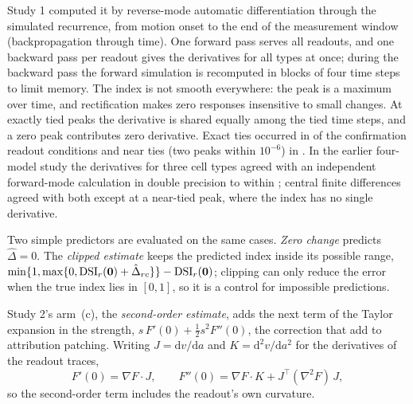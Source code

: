 Study 1 computed it by reverse-mode automatic differentiation through the simulated recurrence, from motion onset to the end of the measurement window (backpropagation through time). One forward pass serves all readouts, and one backward pass per readout gives the derivatives for all \NetTypes{} types at once; during the backward pass the forward simulation is recomputed in blocks of four time steps to limit memory. The index is not smooth everywhere: the peak is a maximum over time, and rectification makes zero responses insensitive to small changes. At exactly tied peaks the derivative is shared equally among the tied time steps, and a zero peak contributes zero derivative. Exact ties occurred in \ExactTieReadouts{} of the \ReadoutConditions{} confirmation readout conditions and near ties (two peaks within $10^{-6}$) in \NearTieReadouts{}. In the earlier four-model study the derivatives for three cell types agreed with an independent forward-mode calculation in double precision to within \TangentMaxErr{}; central finite differences agreed with both except at a near-tied peak, where the index has no single derivative.

Two simple predictors are evaluated on the same cases. \emph{Zero change} predicts $\hat\Delta=0$. The \emph{clipped estimate} keeps the predicted index inside its possible range, $\min\{1,\max\{0,\mathrm{DSI}_r(\bm 0)+\hat\Delta_{rc}\}\}-\mathrm{DSI}_r(\bm 0)$; clipping can only reduce the error when the true index lies in $[0,1]$, so it is a control for impossible predictions.

Study 2's arm~(c), the \emph{second-order estimate}, adds the next term of the Taylor expansion in the strength, $s\,F'(0)+\tfrac12 s^2 F''(0)$, the correction that \citet{zhang2026attribution} add to attribution patching. Writing $J=\mathrm{d}v/\mathrm{d}a$ and $K=\mathrm{d}^2v/\mathrm{d}a^2$ for the derivatives of the readout traces,
\begin{equation}
F'(0) = \nabla F\cdot J, \qquad F''(0) = \nabla F\cdot K + J^{\top}(\nabla^2 F)\,J ,
\label{eq:second}
\end{equation}
so the second-order term includes the readout's own curvature.

